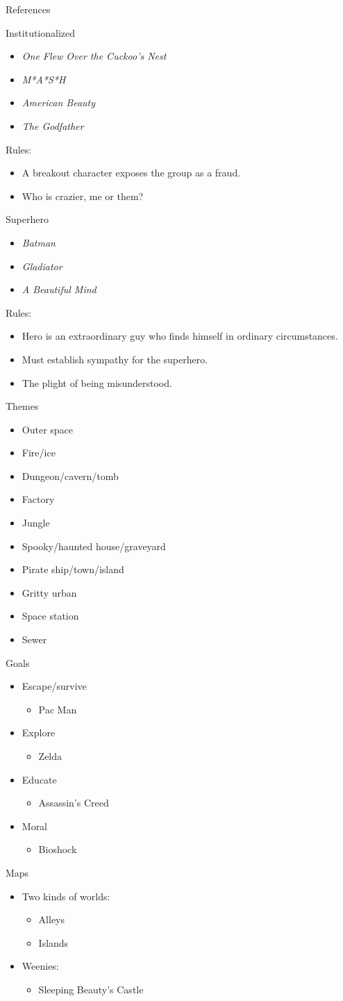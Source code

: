 \documentclass[a4paper,azure,pdf,colorBG,slideColor]{prosper}
\newcommand{\ns}[1]{\vfill \end{slide}\begin{slide}{#1}}
\newcommand{\bi}{\begin{itemize}}
\newcommand{\ei}{\end{itemize}}
\begin{document}
\begin{slide}{References}
\ns{Institutionalized}
\bi
\item {\sl One Flew Over the Cuckoo's Nest}
\item {\sl M*A*S*H}
\item {\sl American Beauty}
\item {\sl The Godfather}
\ei 
Rules:
\bi
\item A breakout character exposes the group as a fraud.
\item Who is crazier, me or them?
\ei

\ns{Superhero}
\bi
\item {\sl Batman}
\item {\sl Gladiator}
\item {\sl A Beautiful Mind}
\ei
Rules:
\bi
\item Hero is an extraordinary guy who finds himself in ordinary
circumstances. 
\item Must establish sympathy for the superhero.
\item The plight of being misunderstood.
\ei

\ns{Themes}
\bi
\item Outer space
\item Fire/ice
\item Dungeon/cavern/tomb
\item Factory
\item Jungle
\item Spooky/haunted house/graveyard
\item Pirate ship/town/island
\item Gritty urban
\item Space station
\item Sewer
\ei

\ns{Goals}
\bi
\item Escape/survive\bi \item Pac Man\ei
\item Explore\bi \item Zelda \ei
\item Educate\bi \item Assassin's Creed \ei
\item Moral\bi \item Bioshock \ei
\ei

\ns{Maps}
\bi
\item Two kinds of worlds:
\bi
\item Alleys
\item Islands
\ei
\item Weenies:
\bi\item Sleeping Beauty's Castle\ei
\ei


\end{slide}
\end{document}
